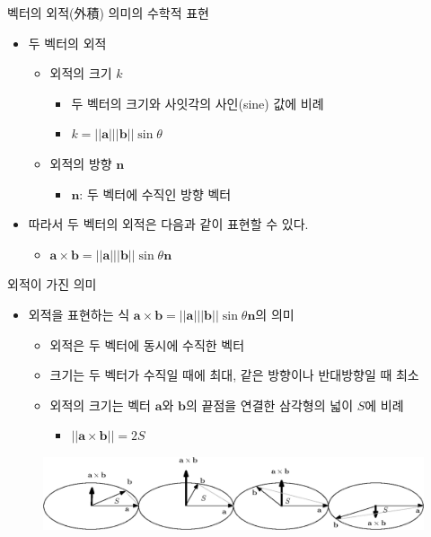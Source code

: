 \begin{frame}{벡터의 외적(外積) 의미의 수학적 표현}

\begin{itemize}
\item 두 벡터의 외적
	\begin{itemize}
	\item 외적의 크기 $k$
		\begin{itemize}
		\item 두 벡터의 크기와 사잇각의 사인(sine) 값에 비례
		\item $k = ||\mathbf a|| |\mathbf b|| \sin \theta$
		\end{itemize}
	\item 외적의 방향 $\mathbf n$
		\begin{itemize}
		\item $\mathbf n$: 두 벡터에 수직인 방향 벡터
		\end{itemize}
	\end{itemize}
\item 따라서 두 벡터의 외적은 다음과 같이 표현할 수 있다.
	\begin{itemize}
	\item $\mathbf a \times \mathbf b = ||\mathbf a|| |\mathbf b|| \sin \theta \mathbf n$
	\end{itemize}
\end{itemize}


\end{frame}

\begin{frame}{외적이 가진 의미}

\begin{itemize}
\item 외적을 표현하는 식 $\mathbf a \times \mathbf b = ||\mathbf a|| |\mathbf b|| \sin \theta \mathbf n$의 의미
	\begin{itemize}
	\item 외적은 두 벡터에 동시에 수직한 벡터
	\item 크기는 두 벡터가 수직일 때에 최대, 같은 방향이나 반대방향일 때 최소
	\item 외적의 크기는 벡터 $\mathbf a$와 $\mathbf b$의 끝점을 연결한 삼각형의 넓이 $S$에 비례
		\begin{itemize}
		\item $|| \mathbf a \times \mathbf b || = 2 S $
		\end{itemize}
		\end{itemize}
\end{itemize}


\begin{figure}
\includegraphics[width=12cm]{Math_vector/crossProductDirSize.eps}
\end{figure}

\end{frame}

